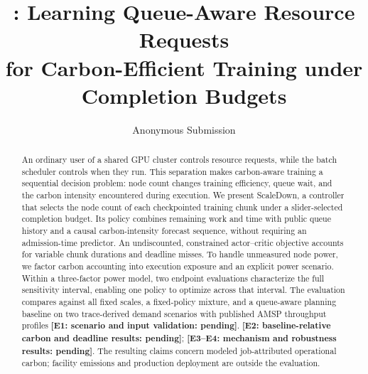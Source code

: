 \documentclass[letterpaper]{article}
\title{\name{}: Learning Queue-Aware Resource Requests\\
for Carbon-Efficient Training under Completion Budgets}
\author{Anonymous Submission}
\newcommand{\name}{ScaleDown}
\newcommand{\pending}[1]{\textbf{[#1: pending]}}
\begin{document}
\maketitle
\begin{abstract}
An ordinary user of a shared GPU cluster controls resource requests, while the
batch scheduler controls when they run. This separation makes carbon-aware
training a sequential decision problem: node count changes training efficiency,
queue wait, and the carbon intensity encountered during execution. We present
\name{}, a controller that selects the node count of each checkpointed training
chunk under a slider-selected completion budget. Its policy combines remaining
work and time with public queue history and a causal carbon-intensity forecast
sequence, without requiring an admission-time predictor. An undiscounted, constrained actor--critic
objective accounts for variable chunk durations and deadline misses. To handle
unmeasured node power, we factor carbon accounting into execution
exposure and an explicit power scenario. Within a three-factor power model,
two endpoint evaluations characterize the full sensitivity interval, enabling
one policy to optimize across that interval. The evaluation compares against
all fixed scales, a fixed-policy mixture, and a queue-aware planning baseline
on two trace-derived demand scenarios with published AMSP throughput profiles
\pending{E1: scenario and input validation}.
\pending{E2: baseline-relative carbon and deadline results};
\pending{E3--E4: mechanism and robustness results}.
The resulting claims concern modeled job-attributed operational carbon;
facility emissions and production deployment are outside the evaluation.
\end{abstract}









\end{document}
